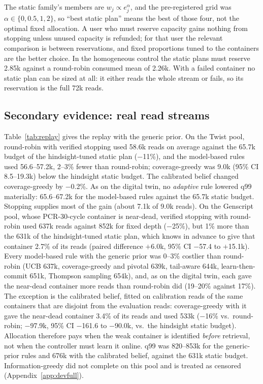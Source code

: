 \documentclass[acmsmall,screen]{acmart}
\begin{document}
The static family's members are $w_j\propto e_j^{\alpha}$, and the pre-registered grid was
$\alpha\in\{0,0.5,1,2\}$, so ``best static plan'' means the best of those four, not the optimal fixed
allocation.  A user who must reserve capacity gains nothing from stopping unless unused capacity is
refunded; for that user the relevant comparison is between reservations, and fixed proportions tuned to
the containers are the better choice.  In the homogeneous control the static plans must reserve 2.85k
against a round-robin consumed mean of 2.26k.  With a failed container no static plan can be sized at
all: it either reads the whole stream or fails, so its reservation is the full 72k reads.

\subsection{Secondary evidence: real read streams}\label{sec:res-replay}

Table~\ref{tab:replay} gives the replay with the generic prior.  On the Twist pool, round-robin with
verified stopping used 58.6k reads on average against the 65.7k budget of the hindsight-tuned static plan
($-$11\%), and the model-based rules used 56.6--57.2k, 2--3\% fewer than round-robin; coverage-greedy was
9.0k (95\% CI 8.5--19.3k) below the hindsight static budget.  The calibrated belief changed
coverage-greedy by $-$0.2\%.  As on the digital twin, no \emph{adaptive} rule lowered q99 materially:
65.6--67.2k for the model-based rules against the 65.7k static budget.  Stopping supplies most of the
gain (about 7.1k of 9.0k reads).  On the Genscript pool, whose PCR-30-cycle container is near-dead,
verified stopping with round-robin used 637k reads against 852k for fixed depth ($-$25\%), but 1\% more
than the 631k of the hindsight-tuned static plan, which knows in advance to give that container 2.7\% of
its reads (paired difference $+$6.0k, 95\% CI $-$57.4 to $+$15.1k).  Every model-based rule with the
generic prior was 0--3\% costlier than round-robin (UCB 637k, coverage-greedy and pivotal 639k, tail-aware
644k, learn-then-commit 651k, Thompson sampling 654k), and, as on the digital twin, each gave the
near-dead container more reads than round-robin did (19--20\% against 17\%).  The exception is the
calibrated belief, fitted on calibration reads of the same containers that are disjoint from the
evaluation reads: coverage-greedy with it gave the near-dead container 3.4\% of its reads and used 533k
($-$16\% vs.\ round-robin; $-$97.9k, 95\% CI $-$161.6 to $-$90.0k, vs.\ the hindsight static budget).
Allocation therefore pays when the weak container is identified \emph{before} retrieval, not when the
controller must learn it online.  q99 was 820--853k for the generic-prior rules and 676k with the
calibrated belief, against the 631k static budget.  Information-greedy did not complete on this pool and
is treated as censored (Appendix~\ref{app:devfull}).
\end{document}

